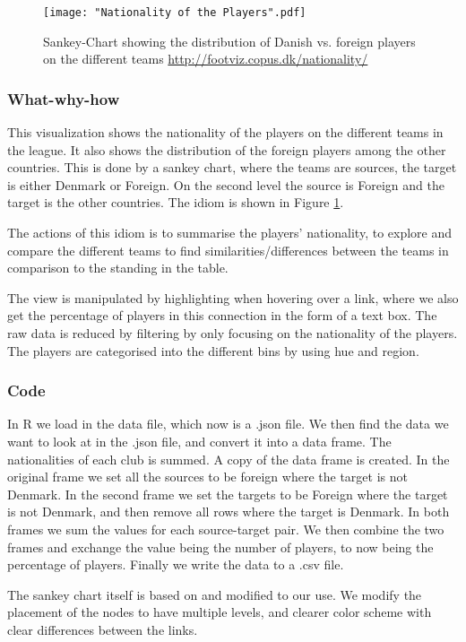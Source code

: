 \documentclass[Report.tex]{subfiles}
\begin{document}
\begin{figure}
\center
\texttt{[image: "Nationality of the Players".pdf]}
\caption{Sankey-Chart showing the distribution of Danish vs. foreign players on the different teams \url{http://footviz.copus.dk/nationality/}}
\label{Fig:Nationality}
\end{figure}


\subsubsection{What-why-how}

This visualization shows the nationality of the players on the different teams in the league. It also shows the distribution of the foreign players among the other countries. This is done by a sankey chart, where the teams are sources, the target is either Denmark or Foreign. On the second level the source is Foreign and the target is the other countries. The idiom is shown in Figure \ref{Fig:Nationality}.

The actions of this idiom is to summarise the players' nationality, to explore and compare the different teams to find similarities/differences between the teams in comparison to the standing in the table. 

The view is manipulated by highlighting when hovering over a link, where we also get the percentage of players in this connection in the form of a text box. The raw data is reduced by filtering by only focusing on the nationality of the players. The players are categorised into the different bins by using hue and region.

\subsubsection{Code}
In R we load in the data file, which now is a .json file. We then find the data we want to look at in the .json file, and convert it into a data frame. The nationalities of each club is summed. A copy of the data frame is created. In the original frame we set all the sources to be foreign where the target is not Denmark. In the second frame we set the targets to be Foreign where the target is not Denmark, and then remove all rows where the target is Denmark. In both frames we sum the values for each source-target pair. We then combine the two frames and exchange the value being the number of players, to now being the percentage of players. Finally we write the data to a .csv file.

The sankey chart itself is based on \cite{Sankey} and modified to our use. We modify the placement of the nodes to have multiple levels, and clearer color scheme with clear differences between the links.
\end{document}
